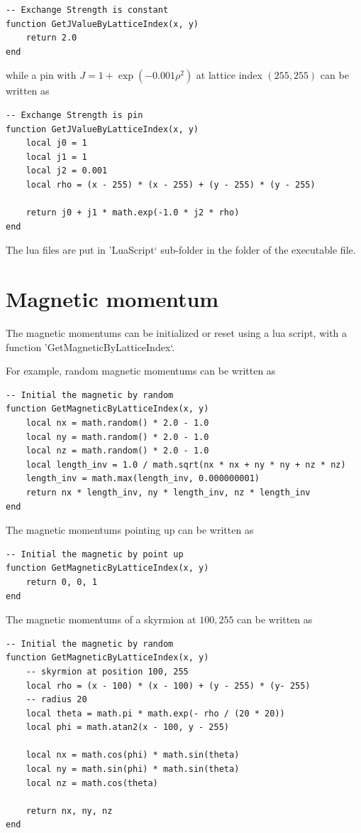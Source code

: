 \documentclass[aps,superscriptaddress,groupedaddress]{revtex4}  %
\begin{document}
\begin{lstlisting}
-- Exchange Strength is constant
function GetJValueByLatticeIndex(x, y)
    return 2.0
end
\end{lstlisting}
while a pin with $J=1+\exp \left(-0.001 \rho ^2\right)$ at lattice index $(255, 255)$ can be written as
\begin{lstlisting}
-- Exchange Strength is pin
function GetJValueByLatticeIndex(x, y)
    local j0 = 1
    local j1 = 1
    local j2 = 0.001
    local rho = (x - 255) * (x - 255) + (y - 255) * (y - 255)

    return j0 + j1 * math.exp(-1.0 * j2 * rho)
end
\end{lstlisting}

The lua files are put in 'LuaScript` sub-folder in the folder of the executable file.

\section{\label{sec:3}Magnetic momentum}

The magnetic momentums can be initialized or reset using a lua script, with a function 'GetMagneticByLatticeIndex`.

For example, random magnetic momentums can be written as
\begin{lstlisting}
-- Initial the magnetic by random
function GetMagneticByLatticeIndex(x, y)
    local nx = math.random() * 2.0 - 1.0
    local ny = math.random() * 2.0 - 1.0
    local nz = math.random() * 2.0 - 1.0
    local length_inv = 1.0 / math.sqrt(nx * nx + ny * ny + nz * nz)
    length_inv = math.max(length_inv, 0.000000001)
    return nx * length_inv, ny * length_inv, nz * length_inv
end
\end{lstlisting}
The magnetic momentums pointing up can be written as
\begin{lstlisting}
-- Initial the magnetic by point up
function GetMagneticByLatticeIndex(x, y)
    return 0, 0, 1
end
\end{lstlisting}
The magnetic momentums of a skyrmion at $100,255$ can be written as
\begin{lstlisting}
-- Initial the magnetic by random
function GetMagneticByLatticeIndex(x, y)
    -- skyrmion at position 100, 255
    local rho = (x - 100) * (x - 100) + (y - 255) * (y- 255)
    -- radius 20
    local theta = math.pi * math.exp(- rho / (20 * 20))
    local phi = math.atan2(x - 100, y - 255)

    local nx = math.cos(phi) * math.sin(theta)
    local ny = math.sin(phi) * math.sin(theta)
    local nz = math.cos(theta)

    return nx, ny, nz
end
\end{lstlisting}
\end{document}
